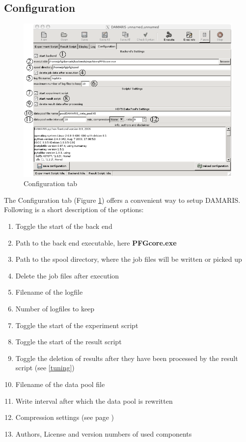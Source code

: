 \documentclass[12pt, a4paper, BCOR10mm, twoside, titlepage, headinclude]{scrbook}
\begin{document}
\subsection{Configuration}
\begin{figure}[htbp]
\centering
\includegraphics[]{config1}
\caption{Configuration tab}
\label{config}
\end{figure}
The Configuration tab  (Figure \ref{config}) offers a convenient way to setup \textsf{DAMARIS}. 
Following is a short description of the options:
\begin{enumerate}

\item Toggle the start  of the back end
\item Path to the back end executable, here \textbf{PFGcore.exe}
\item Path to the spool directory, where the job files will be written or picked up
\item Delete the job files after execution
\item Filename of the logfile 
\item Number of logfiles to keep
\item Toggle the start of the experiment script
\item Toggle the start of the result script
\item Toggle the deletion of results after they have been processed by the result script (see \ref{tuning})
\item Filename of the data pool file
\item Write interval after which the data pool is rewritten
\item Compression settings (see page \pageref{comp})
\item Authors, License and version numbers of used components
\end{enumerate}
\end{document}
